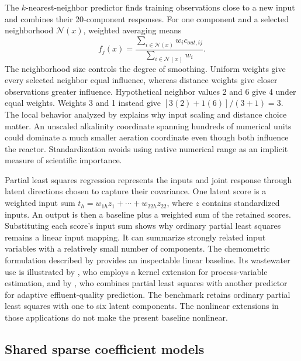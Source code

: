 The $k$-nearest-neighbor predictor finds training observations close to a new input and combines their 20-component responses. For one component and a selected neighborhood $\mathcal N(x)$, weighted averaging means
\[
f_j(x)=\frac{\sum_{i\in\mathcal N(x)}w_i c_{out,ij}}{\sum_{i\in\mathcal N(x)}w_i}.
\]
The neighborhood size controls the degree of smoothing. Uniform weights give every selected neighbor equal influence, whereas distance weights give closer observations greater influence. Hypothetical neighbor values 2 and 6 give 4 under equal weights. Weights 3 and 1 instead give $[3(2)+1(6)]/(3+1)=3$. The local behavior analyzed by \citet{Mack1981} explains why input scaling and distance choice matter. An unscaled alkalinity coordinate spanning hundreds of numerical units could dominate a much smaller aeration coordinate even though both influence the reactor. Standardization avoids using native numerical range as an implicit measure of scientific importance.

Partial least squares regression represents the inputs and joint response through latent directions chosen to capture their covariance. One latent score is a weighted input sum $t_h=w_{1h}z_1+\cdots+w_{22h}z_{22}$, where $z$ contains standardized inputs. An output is then a baseline plus a weighted sum of the retained scores. Substituting each score's input sum shows why ordinary partial least squares remains a linear input mapping. It can summarize strongly related input variables with a relatively small number of components. The chemometric formulation described by \citet{Wold2001} provides an inspectable linear baseline. Its wastewater use is illustrated by \citet{Woo2009}, who employs a kernel extension for process-variable estimation, and by \citet{Yang2021}, who combines partial least squares with another predictor for adaptive effluent-quality prediction. The benchmark retains ordinary partial least squares with one to six latent components. The nonlinear extensions in those applications do not make the present baseline nonlinear.

\subsection{Shared sparse coefficient models}

